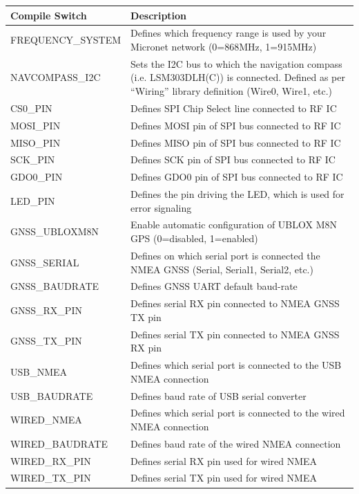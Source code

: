 \documentclass{report}
\begin{document}
\begin{table}[h]
	\begin{tabular}{|l|p{10cm}|}
		\hline
		\textbf{Compile Switch} & \textbf{Description}\\
		\hline
		FREQUENCY\_SYSTEM & Defines which frequency range is used by your Micronet network (0=868MHz, 1=915MHz)\\
		\hline
		NAVCOMPASS\_I2C & Sets the I2C bus to which the navigation compass (i.e. LSM303DLH(C)) is connected. Defined as per “Wiring” library definition (Wire0, Wire1, etc.)\\
		\hline
		CS0\_PIN & Defines SPI Chip Select line connected to RF IC\\
		\hline
		MOSI\_PIN & Defines MOSI pin of SPI bus connected to RF IC\\
		\hline
		MISO\_PIN & Defines MISO pin of SPI bus connected to RF IC\\
		\hline
		SCK\_PIN & Defines SCK pin of SPI bus connected to RF IC\\
		\hline
		GDO0\_PIN & Defines GDO0 pin of SPI bus connected to RF IC\\
		\hline
		LED\_PIN & Defines the pin driving the LED, which is used for error signaling\\
		\hline
		GNSS\_UBLOXM8N & Enable automatic configuration of UBLOX M8N GPS (0=disabled, 1=enabled)\\
		\hline
		GNSS\_SERIAL & Defines on which serial port is connected the NMEA GNSS (Serial, Serial1, Serial2, etc.)\\
		\hline
		GNSS\_BAUDRATE & Defines GNSS UART default baud-rate\\
		\hline
		GNSS\_RX\_PIN & Defines serial RX pin connected to NMEA GNSS TX pin\\
		\hline
		GNSS\_TX\_PIN & Defines serial TX pin connected to NMEA GNSS RX pin\\
		\hline
		USB\_NMEA & Defines which serial port is connected to the USB NMEA connection\\
		\hline
		USB\_BAUDRATE & Defines baud rate of USB serial converter\\
		\hline
		WIRED\_NMEA & Defines which serial port is connected to the wired NMEA connection\\
		\hline
		WIRED\_BAUDRATE & Defines baud rate of the wired NMEA connection\\
		\hline
		WIRED\_RX\_PIN & Defines serial RX pin used for wired NMEA\\
		\hline
		WIRED\_TX\_PIN & Defines serial TX pin used for wired NMEA\\

\end{tabular}
\end{table}
\end{document}
